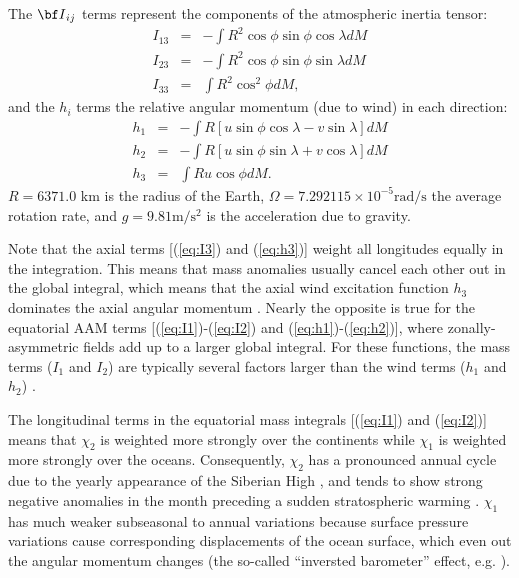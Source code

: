 The ${\bf I}_{ij}$ terms represent the components of the atmospheric inertia tensor:
\begin{eqnarray}
  I_{13} &=& -\int R^2 \cos \phi \sin \phi \cos \lambda dM 
  \label{eq:I1}\\
  I_{23} &=& -\int R^2 \cos \phi \sin \phi \sin \lambda dM 
  \label{eq:I2}\\
  I_{33} &=&  \int R^2 \cos^2 \phi dM ,
  \label{eq:I3}
\end{eqnarray}
and the $h_i$ terms the relative angular momentum (due to wind) in each direction:
\begin{eqnarray}
  h_{1}  &=& -\int R \left[u \sin \phi \cos \lambda - v \sin \lambda \right] dM 
    \label{eq:h1}\\
  h_{2}  &=& -\int R \left[u \sin \phi \sin \lambda + v \cos \lambda \right] dM 
    \label{eq:h2}\\
  h_{3}  &=&  \int R u \cos \phi dM.
    \label{eq:h3}
\end{eqnarray}
%
$R = 6371.0$ km is the radius of the Earth, $\Omega = 7.292115\times 10^{-5} \text{rad}/\text{s}$ the average rotation rate, and $g = 9.81 \text{m}/\text{s}^2$ is the acceleration due to gravity.

Note that the axial terms [(\ref{eq:I3}) and (\ref{eq:h3})] weight all longitudes equally in the integration.
This means that mass anomalies usually cancel each other out in the global integral, which means that the axial wind excitation function $h_3$ dominates the axial angular momentum  \citep{barnesetal1983}.
%
Nearly the opposite is true for the equatorial AAM terms [(\ref{eq:I1})-(\ref{eq:I2}) and (\ref{eq:h1})-(\ref{eq:h2})], where zonally-asymmetric fields add up to a larger global integral.
For these functions, the mass terms ($I_1$ and $I_2$) are typically several factors larger than the wind terms ($h_1$ and $h_2$)  \citep{barnesetal1983}.

The longitudinal terms in the equatorial mass integrals [(\ref{eq:I1}) and (\ref{eq:I2})] means that $\chi_2$ is weighted more strongly over the continents while $\chi_1$ is weighted more strongly over the oceans.
Consequently, $\chi_2$ has a pronounced annual cycle due to the yearly appearance of the Siberian High \citep{dobslawetal2010}, and tends to show strong negative anomalies in the month preceding a sudden stratospheric warming \citep{Neef2014}.
$\chi_1$ has much weaker subseasonal to annual variations because surface pressure variations cause corresponding displacements of the ocean surface, which even out the angular momentum changes (the so-called ``inversted barometer'' effect, e.g. \citet{salsteinrosen1989}).

